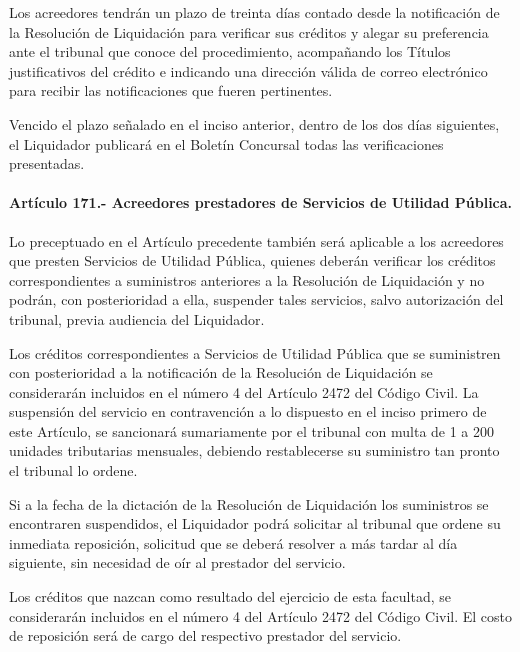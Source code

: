 \documentclass[
]{book}
\begin{document}
Los acreedores tendrán un plazo de treinta días contado desde la notificación de la Resolución de Liquidación para verificar sus créditos y alegar su preferencia ante el tribunal que conoce del procedimiento, acompañando los Títulos justificativos del crédito e indicando una dirección válida de correo electrónico para recibir las notificaciones que fueren pertinentes.

Vencido el plazo señalado en el inciso anterior, dentro de los dos días siguientes, el Liquidador publicará en el Boletín Concursal todas las verificaciones presentadas.

\hypertarget{artuxedculo-171.--acreedores-prestadores-de-servicios-de-utilidad-puxfablica.}{%
\paragraph*{Artículo 171.- Acreedores prestadores de Servicios de Utilidad Pública.}\label{artuxedculo-171.--acreedores-prestadores-de-servicios-de-utilidad-puxfablica.}}

Lo preceptuado en el Artículo precedente también será aplicable a los acreedores que presten Servicios de Utilidad Pública, quienes deberán verificar los créditos correspondientes a suministros anteriores a la Resolución de Liquidación y no podrán, con posterioridad a ella, suspender tales servicios, salvo autorización del tribunal, previa audiencia del Liquidador.

Los créditos correspondientes a Servicios de Utilidad Pública que se suministren con posterioridad a la notificación de la Resolución de Liquidación se considerarán incluidos en el número 4 del Artículo 2472 del Código Civil. La suspensión del servicio en contravención a lo dispuesto en el inciso primero de este Artículo, se sancionará sumariamente por el tribunal con multa de 1 a 200 unidades tributarias mensuales, debiendo restablecerse su suministro tan pronto el tribunal lo ordene.

Si a la fecha de la dictación de la Resolución de Liquidación los suministros se encontraren suspendidos, el Liquidador podrá solicitar al tribunal que ordene su inmediata reposición, solicitud que se deberá resolver a más tardar al día siguiente, sin necesidad de oír al prestador del servicio.

Los créditos que nazcan como resultado del ejercicio de esta facultad, se considerarán incluidos en el número 4 del Artículo 2472 del Código Civil. El costo de reposición será de cargo del respectivo prestador del servicio.
\end{document}
